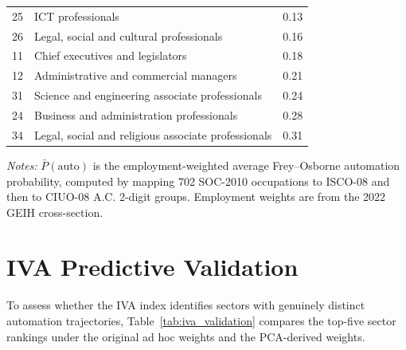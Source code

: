 \documentclass[5p,times,authoryear]{elsarticle}
\begin{document}
\begin{table}[htbp]
\begin{threeparttable}
\begin{tabular}{@{}clc@{}}
25 & ICT professionals & 0.13 \\
26 & Legal, social and cultural professionals & 0.16 \\
11 & Chief executives and legislators & 0.18 \\
12 & Administrative and commercial managers & 0.21 \\
31 & Science and engineering associate professionals & 0.24 \\
24 & Business and administration professionals & 0.28 \\
34 & Legal, social and religious associate professionals & 0.31 \\
\bottomrule
\end{tabular}
\begin{tablenotes}
\footnotesize
\item \textit{Notes:} $\bar{P}(\text{auto})$ is the employment-weighted average Frey--Osborne automation probability, computed by mapping 702 SOC-2010 occupations to ISCO-08 and then to CIUO-08 A.C. 2-digit groups. Employment weights are from the 2022 GEIH cross-section.
\end{tablenotes}
\end{threeparttable}
\end{table}


\section{IVA Predictive Validation}
\label{app:iva_validation}

To assess whether the IVA index identifies sectors with genuinely distinct automation trajectories, Table~\ref{tab:iva_validation} compares the top-five sector rankings under the original ad hoc weights and the PCA-derived weights.
\end{document}
